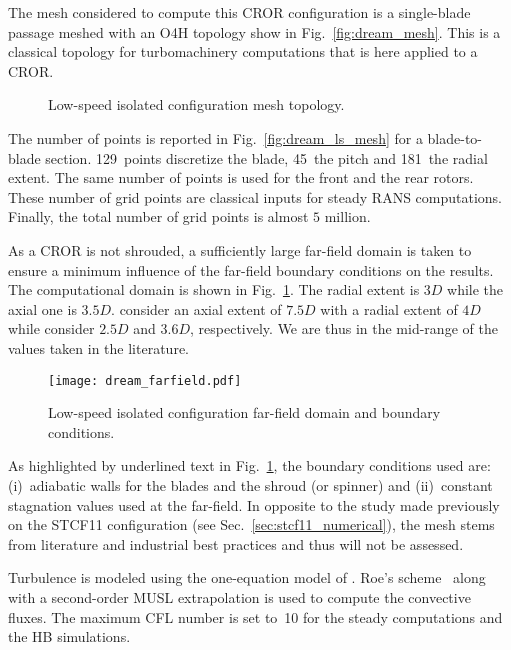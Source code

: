 
The mesh considered to compute this
CROR configuration is a single-blade passage meshed
with an O4H topology show in Fig.~\ref{fig:dream_mesh}. This is a classical
topology for turbomachinery computations that is here applied to 
a CROR.
\begin{figure}[htb]
  \centering
  \caption{Low-speed isolated configuration mesh topology.}
\end{figure}
The number of points is reported in 
Fig.~\ref{fig:dream_ls_mesh} for a blade-to-blade section. 
129~points discretize the blade, 45~the pitch and 181~the radial
extent. The same number of points is used for the front
and the rear rotors. These number of grid points are
classical inputs for steady RANS computations.
Finally, the total number of grid points is almost $5$ million.

As a CROR is not shrouded, a sufficiently large
far-field domain is taken to ensure a minimum influence
of the far-field boundary conditions on the results.
The computational domain is shown in Fig.~\ref{fig:dream_farfield}.
The radial extent is $3D$ while the axial one is $3.5D$.
\citet{Peters2012} consider an axial extent of $7.5D$
with a radial extent of $4D$ while \citet{Zachariadis2011}
consider $2.5D$ and $3.6D$, respectively. We are thus in 
the mid-range of the values taken in the literature.
\begin{figure}[htb]
  \centering
  \texttt{[image: dream\_farfield.pdf]}
  \caption{Low-speed isolated configuration far-field domain and boundary conditions.}
  \label{fig:dream_farfield}
\end{figure}
As highlighted by underlined text in Fig.~\ref{fig:dream_farfield},
the boundary conditions used are: (i)~adiabatic walls
for the blades and the shroud (or spinner) and (ii)~constant
stagnation values used at the far-field.
In opposite to the study made previously on the STCF11
configuration (see Sec.~\ref{sec:stcf11_numerical}),
the mesh stems from literature and industrial best
practices and thus will not be assessed.

Turbulence is modeled using the one-equation model of
\citet{Spalart1992}.  Roe's scheme~\cite{Roe1981} along with a 
second-order MUSL extrapolation 
is used to compute the convective fluxes.
The maximum CFL number is set to~10 for the steady 
computations and the HB simulations.

